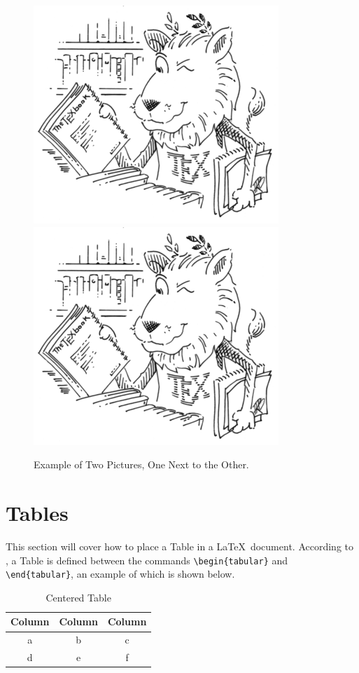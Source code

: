 \begin{figure}[htpb]
    \centering
    \includegraphics[scale=0.4]{lion_large.png} \ \ \ \ \ \ \
    \includegraphics[scale=0.4]{lion_large.png}
    \caption{Example of Two Pictures, One Next to the Other.}
    \label{fig:_side_to_side}
\end{figure}

\section{Tables}
This section will cover how to place a Table in a \LaTeX~document.
According to \cite{overleaftables}, a Table is defined between the commands \verb|\begin{tabular}| and \verb|\end{tabular}|, an example of which is shown below.\par
\begin{table}[htpb]
    \renewcommand{\arraystretch}{1.5}
    \centering
    \caption{Centered Table}
    \label{tab1}
    \begin{tabular}{ccc}
        \hline
        Column & Column & Column \\
        \hline
        a & b & c \\
        d & e & f \\
        \hline
    \end{tabular}
\end{table}


